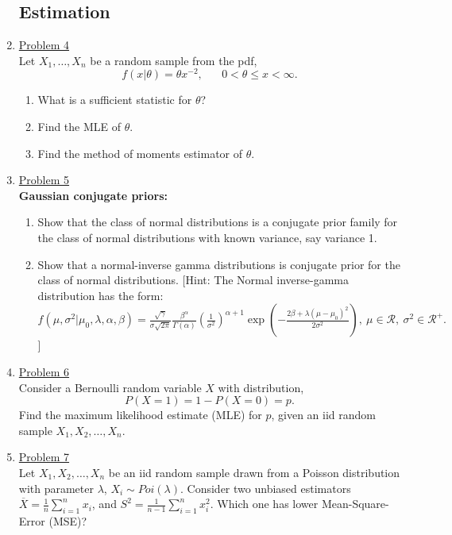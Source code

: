 \documentclass[a4paper,english,12pt]{article}
\begin{document}
\begin{enumerate}
\subsection*{Estimation}
\item \hyperlink{solution4}{Problem 4}\\
Let $X_1,\dots,X_n$ be a random sample from the pdf,
\begin{equation*}
f(x|\theta)=\theta x^{-2},\hspace{20pt}0<\theta\leq x < \infty.
\end{equation*}
\begin{enumerate}
\item What is a sufficient statistic for $\theta$?
\item Find the MLE of $\theta$.
\item Find the method of moments estimator of $\theta$.
\end{enumerate}
\item \hyperlink{solution5}{Problem 5}\\
{\bf Gaussian conjugate priors: }
\begin{enumerate}
\item Show that the class of normal distributions is a conjugate prior family for the class of normal distributions with known variance, say variance 1.
\item Show that a normal-inverse gamma distributions is conjugate prior for the class of normal distributions.
[Hint: The Normal inverse-gamma distribution has the form: \\ $f(\mu,\sigma^2|\mu_0,\lambda,\alpha,\beta)=\frac{\sqrt{\gamma}}{\sigma\sqrt{2\pi}} \frac{\beta^\alpha}{\Gamma(\alpha)} \left(\frac{1}{\sigma^2}\right)^{\alpha+1} \exp\left(-\frac{2\beta+\lambda(\mu-\mu_0)^2}{2\sigma^2} \right),~\mu \in \mathcal{R},~\sigma^2 \in \mathcal{R}^+.$]
\end{enumerate}
\item \hyperlink{solution6}{Problem 6}\\
Consider a Bernoulli random variable $X$ with distribution,
\begin{equation*}
P(X=1)=1-P(X=0)=p.
\end{equation*}
Find the maximum likelihood estimate (MLE) for $p$, given an iid random sample $X_1,X_2,\dots,X_n$.
\item \hyperlink{solution7}{Problem 7}\\
Let $X_1,X_2,\dots,X_n$ be an iid random sample drawn from a Poisson distribution with parameter $\lambda$, $X_i\sim Poi(\lambda)$. Consider two unbiased estimators $\overline{X}=\frac{1}{n}\sum\limits_{i=1}^{n} x_i$, and $S^2=\frac{1}{n-1} \sum\limits_{i=1}^{n} x_i^2$. Which one has lower Mean-Square-Error (MSE)?

\end{enumerate}
\end{document}
